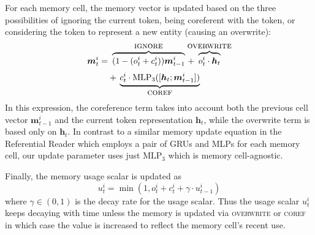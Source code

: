 \documentclass[11pt,a4paper]{article}
\newcommand{\actignore}{\textsc{ignore}\xspace}
\newcommand{\actcoref}{\textsc{coref}\xspace}
\newcommand{\actoverwrite}{\textsc{overwrite}\xspace}
\newcommand{\mlp}{\mathrm{MLP}}
\def\vec#1{\ensuremath{\boldsymbol{{#1}}}}
\begin{document}
For each memory cell, the memory vector is updated based on the three possibilities of ignoring the current token, being coreferent with the token, or considering the token to represent a new entity (causing an overwrite):
\begin{equation}
\begin{aligned}\label{memory_up}
    \vec{m}_t^{i}  = &\ \overbrace{(1 - (o_t^{i} + c_t^{i})) \vec{m}_{t-1}^{i}}^{\mbox{\actignore}}  \,+\!\!\!\!\!\! \overbrace{o_t^{i}\cdot \vec{h}_t}^{\mbox{\actoverwrite}} \\[3pt]
    & +\, \underbrace{c_t^{i} \cdot \mlp_3([\vec{h}_t; \vec{m}_{t-1}^i])}_{\mbox{\actcoref}}
\end{aligned}
\end{equation}
In this expression, the coreference term takes into account both the previous cell vector $\vec{m}_{t-1}^{i}$ and the current token representation $\vec{h}_t$, while the overwrite term is based only on $\vec{h}_t$.  In contrast to a similar
 memory update equation in the Referential Reader which employs a pair of GRUs and MLPs for each memory cell, our update parameter uses just $\mathrm{MLP}_3$ which is memory cell-agnostic. 

Finally, the memory usage scalar is
updated as
\begin{equation}
 u_t^{i} = \min(1, o_t^{i} + c_t^{i} + \gamma \cdot u_{t-1}^{i})
\end{equation}
where $\gamma \in (0, 1)$ is the decay rate for the usage scalar.
Thus the usage scalar $u_t^{i}$ keeps decaying with time unless the memory is updated via \actoverwrite or \actcoref in which case the value is increased to reflect the memory cell's recent use.
 
\end{document}
